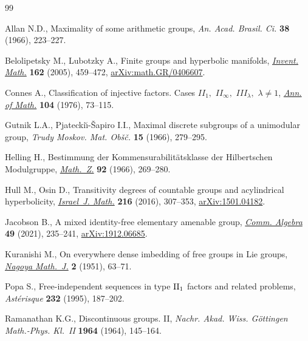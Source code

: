 \documentclass[pdftex]{sigma}
\numberwithin{equation}{section}
\begin{document}
\vspace{-.5ex}
\begin{thebibliography}{99}
\footnotesize\itemsep=-1pt

Allan N.D., Maximality of some arithmetic groups, \textit{An. Acad. Brasil.
 Ci.} \textbf{38} (1966), 223--227.

Belolipetsky M., Lubotzky A., Finite groups and hyperbolic manifolds,
 \href{https://doi.org/10.1007/s00222-005-0446-z}{\textit{Invent. Math.}} \textbf{162} (2005), 459--472,
 \href{https://arxiv.org/abs/math.GR/0406607}{arXiv:math.GR/0406607}.

Connes A., Classification of injective factors. {C}ases {$II_{1},$}
 {$II_{\infty },$} {$III_{\lambda },$} {$\lambda \not=1$}, \href{https://doi.org/10.2307/1971057}{\textit{Ann. of
 Math.}} \textbf{104} (1976), 73--115.

Gutnik L.A., Pjatecki\u{\i}-\v{S}apiro I.I., Maximal discrete subgroups of a
 unimodular group, \textit{Trudy Moskov. Mat. Ob\v{s}\v{c}.} \textbf{15}
 (1966), 279--295.

Helling H., Bestimmung der {K}ommensurabilit\"atsklasse der {H}ilbertschen
 {M}odulgruppe, \href{https://doi.org/10.1007/BF01112194}{\textit{Math.~Z.}} \textbf{92} (1966), 269--280.

Hull M., Osin D., Transitivity degrees of countable groups and acylindrical
 hyperbolicity, \href{https://doi.org/10.1007/s11856-016-1411-9}{\textit{Israel~J. Math.}} \textbf{216} (2016), 307--353,
 \href{https://arxiv.org/abs/1501.04182}{arXiv:1501.04182}.

Jacobson B., A mixed identity-free elementary amenable group, \href{https://doi.org/10.1080/00927872.2020.1797073}{\textit{Comm.
 Algebra}} \textbf{49} (2021), 235--241, \href{https://arxiv.org/abs/1912.06685}{arXiv:1912.06685}.

Kuranishi M., On everywhere dense imbedding of free groups in {L}ie groups,
 \href{http://projecteuclid.org/euclid.nmj/1118764740}{\textit{Nagoya Math.~J.}} \textbf{2} (1951), 63--71.

Popa S., Free-independent sequences in type {${\rm II}_1$} factors and related
 problems, \textit{Ast\'erisque} \textbf{232} (1995), 187--202.

Ramanathan K.G., Discontinuous groups. {II}, \textit{Nachr. Akad. Wiss.
 G\"ottingen Math.-Phys. Kl.~II} \textbf{1964} (1964), 145--164.


\end{thebibliography}
\end{document}
